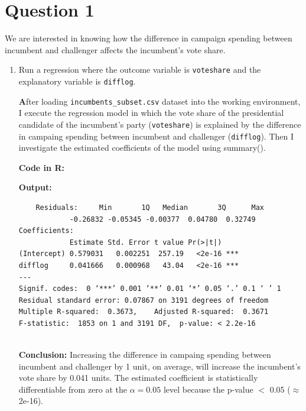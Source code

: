 \documentclass[12pt,letterpaper]{article}
\begin{document}
\section*{Question 1}
\vspace{.25cm}
\noindent We are interested in knowing how the difference in campaign spending between incumbent and challenger affects the incumbent's vote share. 
	\begin{enumerate}
		\item Run a regression where the outcome variable is \texttt{voteshare} and the explanatory variable is \texttt{difflog}.	\vspace{0.5cm}
		
		  
		\vspace{.25cm}
		
		\noindent \textbf After loading \texttt{incumbents\_subset.csv} dataset into the working environment, I execute the regression model in which the vote share of the presidential candidate of the incumbent's party (\texttt{voteshare}) is explained by the difference in campaing spending between incumbent and challenger (\texttt{difflog}). Then I investigate the estimated coefficients of the model using summary(). \vspace{0.5cm}
	
	\noindent \textbf{Code in R:}
	  
	\vspace{.25cm}
	
	\noindent \textbf{Output: }
		\begin{footnotesize}
			\begin{verbatim}
	Residuals:     Min       1Q   Median       3Q      Max
            -0.26832 -0.05345 -0.00377  0.04780  0.32749 
Coefficients:            
            Estimate Std. Error t value Pr(>|t|)    
(Intercept) 0.579031   0.002251  257.19   <2e-16 ***
difflog     0.041666   0.000968   43.04   <2e-16 ***
---
Signif. codes:  0 ‘***’ 0.001 ‘**’ 0.01 ‘*’ 0.05 ‘.’ 0.1 ‘ ’ 1
Residual standard error: 0.07867 on 3191 degrees of freedom
Multiple R-squared:  0.3673,	Adjusted R-squared:  0.3671 
F-statistic:  1853 on 1 and 3191 DF,  p-value: < 2.2e-16				
		
	\end{verbatim}  
		\end{footnotesize}


	
	\noindent \textbf{Conclusion:} Increasing the difference in campaing spending between incumbent and challenger by 1 unit, on average, will increase the incumbent's vote share by 0.041 units. The estimated coefficient is statistically differentiable from zero at the  $\alpha=0.05$ level because the p-value $<$ 0.05 ($\approx $2e-16).
	 \vspace{1 cm}
	

\end{enumerate}
\end{document}
